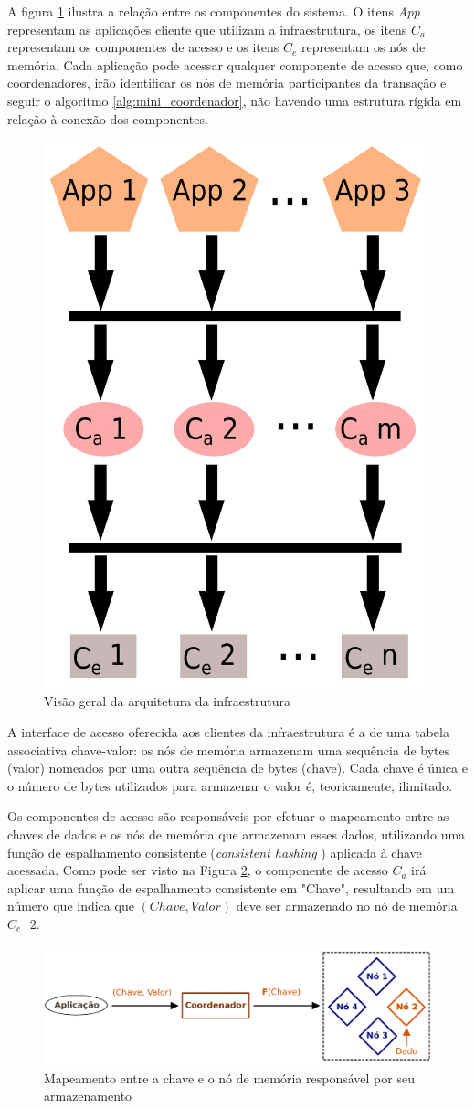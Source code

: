 \documentclass[11pt,twoside,a4paper]{book}
\begin{document}
A figura \ref{fig:overview_arquitetura} ilustra a relação entre os componentes do sistema. O itens \emph{App} representam as aplicações cliente que utilizam a infraestrutura, os itens \emph{$C_a$} representam os componentes de acesso e os itens \emph{$C_e$} representam os nós de memória. Cada aplicação pode acessar qualquer componente de acesso que, como coordenadores, irão identificar os nós de memória participantes da transação e seguir o algoritmo \ref{alg:mini_coordenador}, não havendo uma estrutura rígida em relação à conexão dos componentes.

\begin{figure}
  \centering
  \includegraphics[width=.40\textwidth]{overview_arquitetura} 
  \caption{Visão geral da arquitetura da infraestrutura}
  \label{fig:overview_arquitetura} 
\end{figure}

A interface de acesso oferecida aos clientes da infraestrutura é a de uma tabela associativa chave-valor: os nós de memória armazenam uma sequência de bytes (valor) nomeados por uma outra sequência de bytes (chave). Cada chave é única e o número de bytes utilizados para armazenar o valor é, teoricamente, ilimitado. 

Os componentes de acesso são responsáveis por efetuar o mapeamento entre as chaves de dados e os nós de memória que armazenam esses dados, utilizando uma função de espalhamento consistente (\emph{consistent hashing} \cite{consistent_hashing}) aplicada à chave acessada. Como pode ser visto na Figura \ref{fig:funcao_espalhamento}, o componente de acesso $C_a$ irá aplicar uma função de espalhamento consistente em "Chave", resultando em um número que indica que $(Chave, Valor)$ deve ser armazenado no nó de memória $C_e\text{ }2$.

\begin{figure}
  \centering
  \includegraphics[width=.80\textwidth]{funcao_espalhamento} 
  \caption{Mapeamento entre a chave e o nó de memória responsável por seu armazenamento}
  \label{fig:funcao_espalhamento} 
\end{figure}
\end{document}
